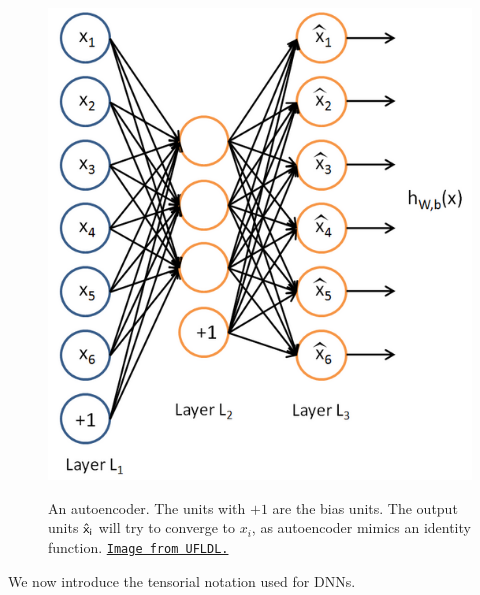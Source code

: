 \documentclass[12pt]{article}  %
\begin{document}
\begin{figure}[ht]
\centering
\includegraphics[scale=0.4]{images/autoencoder.png}\\
\caption{An autoencoder. The units with $+1$ are the bias units. The output units $\sf{\hat{x}_i}$ will try to converge to $x_i$, as autoencoder mimics an identity function. \href{http://deeplearning.stanford.edu/wiki/index.php/File:Autoencoder636.png}{\tt Image from UFLDL.}}\label{autoencoder-fig}
\end{figure}


We now introduce the tensorial notation used for DNNs.
\end{document}
